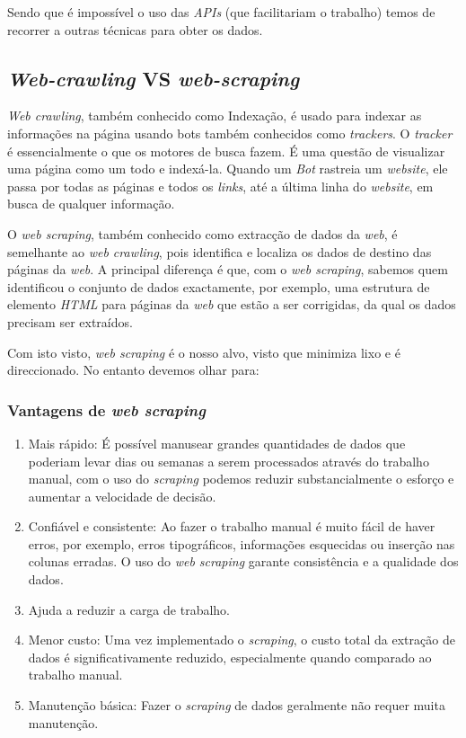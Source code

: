 Sendo que é impossível o uso das \textit{APIs} (que facilitariam o trabalho) temos de recorrer a outras técnicas para obter os dados.

\subsection{\textit{Web-crawling} VS \textit{web-scraping}}

\textit{Web crawling}, também conhecido como Indexação, é usado para indexar as informações na página usando bots também conhecidos como \textit{trackers}.
O \textit{tracker} é essencialmente o que os motores de busca fazem.
É uma questão de visualizar uma página como um todo e indexá-la.
Quando um \textit{Bot} rastreia um \textit{website}, ele passa por todas as páginas e todos os \textit{links}, até a última linha do \textit{website}, em busca de qualquer informação.

O \textit{web scraping}, também conhecido como extracção de dados da \textit{web}, é semelhante ao \textit{web crawling}, pois identifica e localiza os dados de destino das páginas da \textit{web}.
A principal diferença é que, com o \textit{web scraping}, sabemos quem identificou o conjunto de dados exactamente, por exemplo, uma estrutura de elemento \textit{HTML} para páginas da \textit{web} que estão a ser corrigidas, da qual os dados precisam ser extraídos.

Com isto visto, \textit{web scraping} é o nosso alvo, visto que minimiza lixo e é direccionado.
No entanto devemos olhar para:

\subsubsection{Vantagens de \textit{web scraping}}

\begin{enumerate}
  \item Mais rápido: É possível manusear grandes quantidades de dados que poderiam levar dias ou semanas a serem processados através do trabalho manual, com o uso do \textit{scraping} podemos reduzir substancialmente o esforço e aumentar a velocidade de decisão.
  \item Confiável e consistente: Ao fazer o trabalho manual é muito fácil de haver erros, por exemplo, erros tipográficos, informações esquecidas ou inserção nas colunas erradas. O uso do \textit{web scraping} garante consistência e a qualidade dos dados.
  \item Ajuda a reduzir a carga de trabalho.
  \item Menor custo: Uma vez implementado o \textit{scraping}, o custo total da extração de dados é significativamente reduzido, especialmente quando comparado ao trabalho manual.
  \item Manutenção básica: Fazer o \textit{scraping} de dados geralmente não requer muita manutenção.
\end{enumerate}

